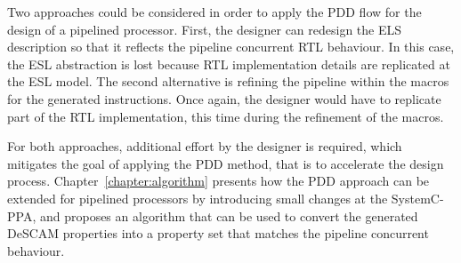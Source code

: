 Two approaches could be considered in order to apply the PDD flow for the design of a pipelined processor. First, the designer can redesign the ELS description so that it reflects the pipeline concurrent RTL behaviour. In this case, the ESL abstraction is lost because RTL implementation details are replicated at the ESL model. The second alternative is refining the pipeline within the macros for the generated instructions. Once again, the designer would have to replicate part of the RTL implementation, this time during the refinement of the macros. 

For both approaches, additional effort by the designer is required, which mitigates the goal of applying the PDD method, that is to accelerate the design process. Chapter~\ref{chapter:algorithm} presents how the PDD approach can be extended for pipelined processors by introducing small changes at the SystemC-PPA, and proposes an algorithm that can be used to convert the generated DeSCAM properties into a property set that matches the pipeline concurrent behaviour. 

